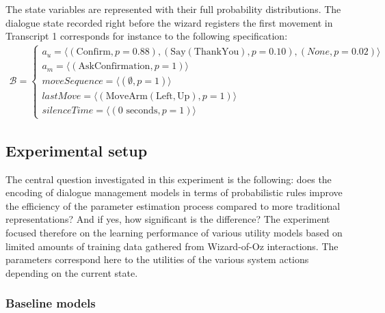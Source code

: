 The state variables are represented with their full probability distributions. The dialogue state recorded right before the wizard registers the first movement in Transcript 1 corresponds for instance to the following specification: 
\begin{align*}
\mathcal{B} = \begin{cases} a_u = \langle (\mathrm{Confirm}, p\!=\!0.88), (\mathrm{Say(ThankYou)}, p\!=\!0.10), (\mathit{None}, p\!=\!0.02) \rangle \\
a_m = \langle (\mathrm{AskConfirmation}, p\!=\!1) \rangle \\
\mathit{moveSequence} = \langle ( \emptyset, p\!=\!1) \rangle \\
\mathit{lastMove} = \langle (\mathrm{MoveArm(Left,Up)}, p\!=\!1) \rangle \\
\mathit{silenceTime} = \langle (0 \textrm{ seconds}, p\!=\!1) \rangle \end{cases}
\end{align*}

\subsection{Experimental setup}
\label{sec:wozlearning-experiments-setup}

The central question investigated in this experiment is the following: does the encoding of dialogue management models in terms of probabilistic rules improve the efficiency of the parameter estimation process compared to more traditional representations? And if yes, how significant is the difference? The experiment focused therefore on the learning performance of various utility models based on limited amounts of training data gathered from Wizard-of-Oz interactions. The parameters correspond here to the utilities of the various system actions depending on the current state.

\subsubsection*{Baseline models}

